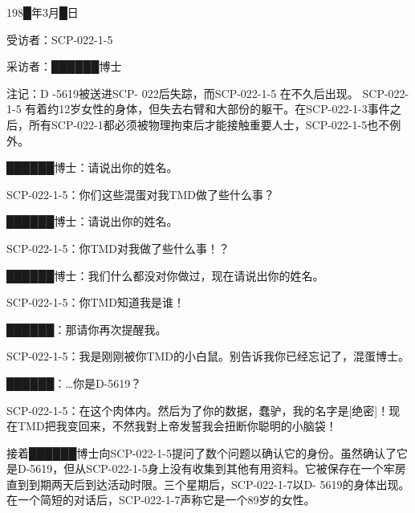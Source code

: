 198█年3月█日

受访者：SCP-022-1-5

采访者：██████博士

注记：D -5619被送进SCP- 022后失踪，而SCP-022-1-5 在不久后出现。 SCP-022-1-5 有着约12岁女性的身体，但失去右臂和大部份的躯干。在SCP-022-1-3事件之后，所有SCP-022-1都必须被物理拘束后才能接触重要人士，SCP-022-1-5也不例外。

\begin{scpbox}

\bb{[对话开始]}

██████博士：请说出你的姓名。

SCP-022-1-5：你们这些混蛋对我TMD做了些什么事？

██████博士：请说出你的姓名。

SCP-022-1-5：你TMD对我做了些什么事！？

██████博士：我们什么都没对你做过，现在请说出你的姓名。

SCP-022-1-5：你TMD知道我是谁！

██████：那请你再次提醒我。

SCP-022-1-5：我是刚刚被你TMD的小白鼠。别告诉我你已经忘记了，混蛋博士。

██████：…你是D-5619？

SCP-022-1-5：在这个肉体内。然后为了你的数据，蠢驴，我的名字是[绝密]！现在TMD把我变回来，不然我對上帝发誓我会扭断你聪明的小脑袋！

\bb{[对话结束]}

\end{scpbox}

接着██████博士向SCP-022-1-5提问了数个问题以确认它的身份。虽然确认了它是D-5619，但从SCP-022-1-5身上没有收集到其他有用资料。它被保存在一个牢房直到到期两天后到达活动时限。三个星期后，SCP-022-1-7以D- 5619的身体出现。在一个简短的对话后，SCP-022-1-7声称它是一个89岁的女性。
